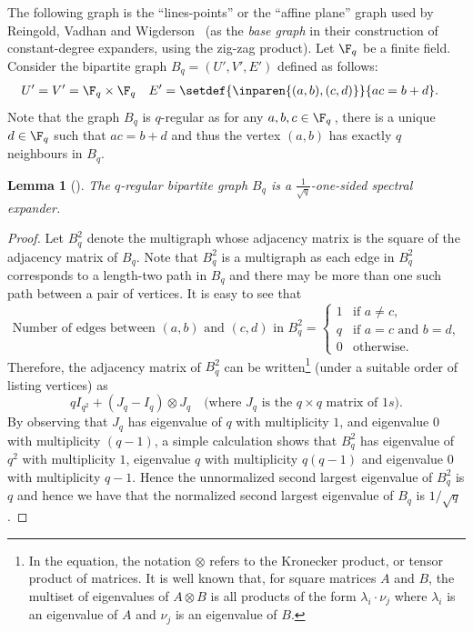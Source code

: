 \documentclass[11pt]{article}
\newtheorem{lemma}[theorem]{Lemma}
\begin{document}
The following graph is the ``lines-points'' or the ``affine plane'' graph used by Reingold, Vadhan and Wigderson~\cite{ReingoldVW2005} (as the \emph{base graph} in
their  %
 construction of constant-degree expanders, using the zig-zag product). 
Let $\F_q$ be a finite field.
Consider the bipartite graph $B_q = (U',V', E')$ defined as follows:
\begin{align*}
%
%
%
U'=V' & = \F_q \times \F_q &E' & = \setdef{\inparen{(a,b),(c,d)}}{ac = b+d}.%
\end{align*}
Note that the graph $B_q$ is $q$-regular as for any 
%
%
$a,b,c \in \F_q\,$,  %
there is a unique $d \in \F_q$ such that $ac = b+d$ and thus the vertex $(a,b)$ has exactly $q$ neighbours in $B_q$. 
\begin{lemma}[{\cite[Lemma 5.1]{ReingoldVW2005}}]
  The $q$-regular bipartite graph $B_q$ is a
  $\frac{1}{\sqrt{q}}$-one-sided spectral expander.
\end{lemma}
\begin{proof}
  Let $B_q^2$ denote the multigraph whose adjacency matrix is the 
  square of the adjacency matrix of $B_q$. 
  Note that $B_q^2$ is a multigraph as each edge in $B_q^2$ corresponds to
%
a length-two path  %
in $B_q$ and there may be more than one such path between a pair of vertices. 
%
%
%
It is easy to see that
\[
%
\text{Number of edges between $(a,b)$ and $(c,d)$ in $B_q^2$} =
\begin{cases} 1 & \text{if $a \neq c$,}\\
      q & \text{if $a = c$ and $b = d$,}\\
      0 & \text{otherwise.}
    \end{cases}
    \]
Therefore, the adjacency matrix of $B_q^2$
%
%
%
can be written\footnote{In the equation, the notation $\otimes$ refers to the
Kronecker product, or tensor product of matrices. It is well known
that, for square matrices $A$ and $B$, the
%
multiset  %
of eigenvalues of
%
$A \otimes B$  %
is all products of the form $\lambda_i \cdot \nu_j$ where $\lambda_i$ is an eigenvalue 
of $A$ and $\nu_j$ is an eigenvalue of $B$.} (under a suitable order of listing vertices) as
  \[
    q I_{q^2} + (J_q - I_q)\otimes J_q \quad\text{(where $J_q$ is the $q\times q$ matrix of $1s$)}.
  \]
  By observing that $J_q$ has eigenvalue of $q$ with multiplicity $1$, and eigenvalue $0$ with multiplicity $(q-1)$, a simple calculation shows that $B_q^2$ has eigenvalue of $q^2$ with multiplicity $1$, eigenvalue $q$ with multiplicity $q(q-1)$ and eigenvalue $0$ with multiplicity $q-1$. 
  Hence the unnormalized second largest eigenvalue of $B_q^2$ is $q$ and hence we have that the normalized second largest eigenvalue of $B_q$ is $1/\sqrt{q}$. 
\end{proof}
\end{document}
